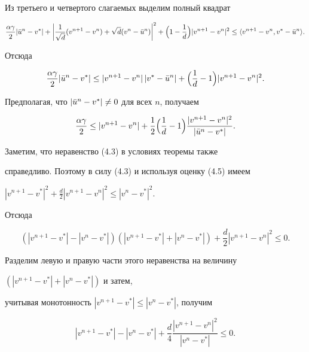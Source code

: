 \begin{pf}
Из третьего и четвертого слагаемых выделим полный квадрат


$$


\frac{\alpha\gamma}{2}|\Bar u^n-v^*|+


\biggl|\frac{1}{\sqrt d}(v^{n+1}-v^n)+\sqrt{d}(v^n-\Bar u^n)


\biggr|^2+


\Bigl(1-\frac{1}{d}\Bigr)|v^{n+1}-v^n|^2\le


\la v^{n+1}-v^n,v^*-\Bar u^n\ra.


$$


Отсюда


$$


\frac{\alpha\gamma}{2}|\Bar u^n-v^*|\le |v^{n+1}-v^n|\,


|v^*-\Bar u^n|+\Bigl(\frac{1}{d}-1\Bigr)|v^{n+1}-v^n|^2.


$$


Предполагая, что $|\Bar u^n-v^*|\ne 0$ для всех $n$, получаем


\begin{equation}


\frac{\alpha\gamma}{2}\le


|v^{n+1}-v^n|+\frac{1}{2}\Bigl(\frac{1}{d}-1\Bigr)


\frac{|v^{n+1}-v^n|^2}{|\Bar u^n-v^*|}.


\end{equation}


Заметим, что неравенство (4.3) в условиях теоремы также


справедливо. Поэтому в силу (4.3) и используя оценку (4.5) имеем


$|v^{n+1}-v^*|^2+\frac{d}{2}|v^{n+1}-v^n|^2\le|v^n-v^*|^2$.


Отсюда


$$


(|v^{n+1}-v^*|-|v^n-v^*|)(|v^{n+1}-v^*|+|v^n-v^*|)+


\frac{d}{2}|v^{n+1}-v^n|^2\le 0.


$$


Разделим левую и правую части этого неравенства на величину


$(|v^{n+1}-v^*|+|v^n-v^*|)$ и затем,


учитывая монотонность $|v^{n+1}-v^*|\le|v^n-v^*|$, получим


\begin{equation}


|v^{n+1}-v^*|-|v^n-v^*|+\frac{d}{4}


\frac{|v^{n+1}-v^n|^2}{|v^n-v^*|}\le 0.



\end{equation}
\end{pf}
